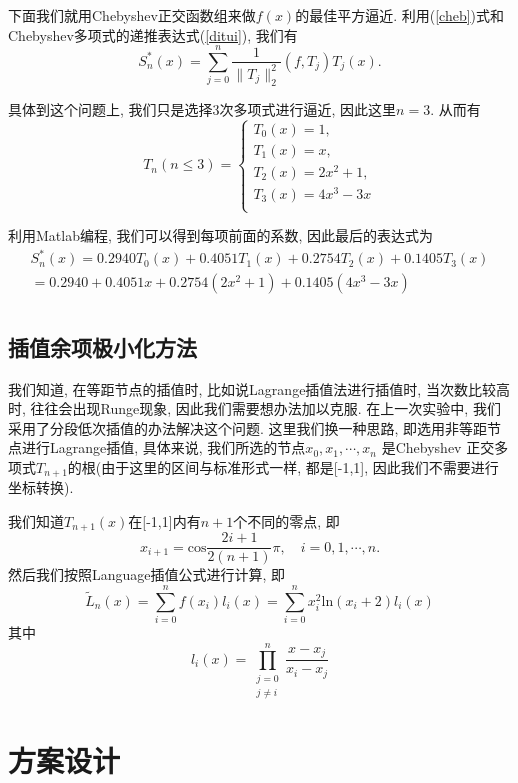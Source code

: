 \documentclass[a4paper]{article}
\begin{document}
\begin{spacing}{1.5}
\begin{CJK*}{GBK}{song}
下面我们就用Chebyshev正交函数组来做$f(x)$的最佳平方逼近. 利用(\ref{cheb})式和Chebyshev多项式的递推表达式(\ref{ditui}), 我们有
\begin{equation}
S_n^*(x)=\sum^n_{j=0}\frac{1}{\parallel T_j\parallel_2^2}(f,T_j)T_j(x).
\end{equation}

具体到这个问题上, 我们只是选择3次多项式进行逼近, 因此这里$n=3$. 从而有
$$T_n(n\leqslant3)=\left\{\begin{array}{llll}T_0(x)=1,\\T_1(x)=x,\\T_2(x)=2x^2+1,\\T_3(x)=4x^3-3x\\ \end{array}\right.$$

利用Matlab编程, 我们可以得到每项前面的系数, 因此最后的表达式为
$$ \begin{array}{rr}S_n^*(x)=0.2940T_0(x)+ 0.4051T_1(x)+0.2754T_2(x)+0.1405T_3(x)\\=0.2940+ 0.4051x+0.2754(2x^2+1)+0.1405(4x^3-3x)\\ \end{array}$$

\subsection{插值余项极小化方法}
我们知道, 在等距节点的插值时, 比如说Lagrange插值法进行插值时, 当次数比较高时, 往往会出现Runge现象, 因此我们需要想办法加以克服. 在上一次实验中, 我们采用了分段低次插值的办法解决这个问题. 这里我们换一种思路, 即选用非等距节点进行Lagrange插值, 具体来说, 我们所选的节点$x_0, x_1,\cdots,x_n$ 是Chebyshev 正交多项式$T_{n+1}$的根(由于这里的区间与标准形式一样, 都是[-1,1], 因此我们不需要进行坐标转换).

我们知道$T_{n+1}(x)$在[-1,1]内有$n+1$个不同的零点, 即
\begin{equation}
x_{i+1}=\text{cos}\frac{2i+1}{2(n+1)}\pi, \quad i=0, 1, \cdots, n.
\end{equation}
然后我们按照Language插值公式进行计算, 即
\begin{equation}\label{Ln}
\tilde{L}_n(x)=\sum_{i=0}^n f(x_i)l_i(x)=\sum_{i=0}^n x_i^2\text{ln}(x_i+2)l_i(x)
\end{equation}
其中
$$l_i(x)=\mathop{\prod}\limits_{\substack{j=0 \\j\neq i}}^{n}\frac{x-x_j}{x_i-x_j}$$


\section{方案设计}


\end{CJK*}
\end{spacing}
\end{document}
